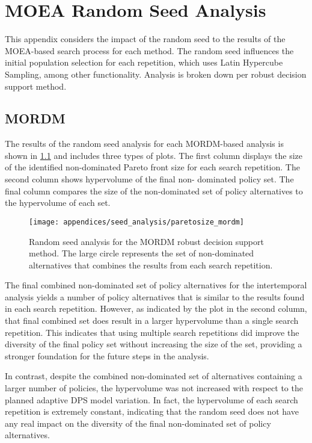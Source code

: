 \chapter{MOEA Random Seed Analysis}
\label{appendix-seedanalysis}

This appendix considers the impact of the random seed to the results of the MOEA-based search process for each method. The random seed influences the initial population selection for each repetition, which uses Latin Hypercube Sampling, among other functionality. Analysis is broken down per robust decision support method. 

\section{MORDM} \label{seedanalysis-mordm}
The results of the random seed analysis for each MORDM-based analysis is shown in \cref{fig:pareto-mordm} and includes three types of plots. The first column displays the size of the identified non-dominated Pareto front size for each search repetition. The second column shows hypervolume of the final non- dominated policy set. The final column compares the size of the non-dominated set of policy alternatives to the hypervolume of each set. 

\begin{figure}[H]
    \centering
    
    \texttt{[image: appendices/seed\_analysis/paretosize\_mordm]}
    \caption[Random seed analysis for all uses of MORDM]{Random seed analysis for the MORDM robust decision support method. The large circle represents the set of non-dominated alternatives that combines the results from each search repetition.}
    \label{fig:pareto-mordm}
\end{figure}

The final combined non-dominated set of policy alternatives for the intertemporal analysis yields a number of policy alternatives that is similar to the results found in each search repetition. However, as indicated by the plot in the second column, that final combined set does result in a larger hypervolume than a single search repetition. This indicates that using multiple search repetitions did improve the diversity of the final policy set without increasing the size of the set, providing a stronger foundation for the future steps in the analysis. 

In contrast, despite the combined non-dominated set of alternatives containing a larger number of policies, the hypervolume was not increased with respect to the planned adaptive DPS model variation. In fact, the hypervolume of each search repetition is extremely constant, indicating that the random seed does not have any real impact on the diversity of the final non-dominated set of policy alternatives. 

